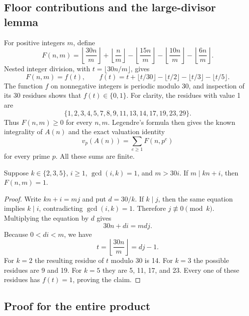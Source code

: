 \subsection{Floor contributions and the large-divisor lemma}

For positive integers $m$, define
\[
 F(n,m)=\left\lfloor\frac{30n}{m}\right\rfloor
 +\left\lfloor\frac{n}{m}\right\rfloor
 -\left\lfloor\frac{15n}{m}\right\rfloor
 -\left\lfloor\frac{10n}{m}\right\rfloor
 -\left\lfloor\frac{6n}{m}\right\rfloor.
\]
Nested integer division, with $t=\lfloor30n/m\rfloor$, gives
\[
 F(n,m)=f(t),\qquad
 f(t)=t+\lfloor t/30\rfloor-\lfloor t/2\rfloor
                     -\lfloor t/3\rfloor-\lfloor t/5\rfloor.
\]
The function $f$ on nonnegative integers is periodic modulo 30, and
inspection of its 30 residues shows that $f(t)\in\{0,1\}$.
For clarity, the residues with value 1 are
\[
 \{1,2,3,4,5,7,8,9,11,13,14,17,19,23,29\}.
\]
Thus $F(n,m)\ge0$ for every $n,m$.  Legendre's formula then gives the
known integrality of $A(n)$ and the exact valuation identity
\begin{equation}
\label{eq:a211417-valuation}
 v_p(A(n))=\sum_{e\ge1}F(n,p^e)
\end{equation}
for every prime $p$.  All these sums are finite.

\begin{lemma}
\label{lem:a211417-large-divisor}
Suppose $k\in\{2,3,5\}$, $i\ge1$, $\gcd(i,k)=1$, and $m>30i$.
If $m\mid kn+i$, then $F(n,m)=1$.
\end{lemma}
\begin{proof}
Write $kn+i=mj$ and put $d=30/k$.  If $k\mid j$, then the same equation
implies $k\mid i$, contradicting $\gcd(i,k)=1$.  Therefore
$j\not\equiv0\pmod k$.
Multiplying the equation by $d$ gives
\[
 30n+di=mdj.
\]
Because $0<di<m$, we have
\[
 t=\left\lfloor\frac{30n}{m}\right\rfloor=dj-1.
\]
For $k=2$ the resulting residue of $t$ modulo 30 is 14.
For $k=3$ the possible residues are 9 and 19.
For $k=5$ they are 5, 11, 17, and 23.
Every one of these residues has $f(t)=1$, proving the claim.
\end{proof}

\subsection{Proof for the entire product}

